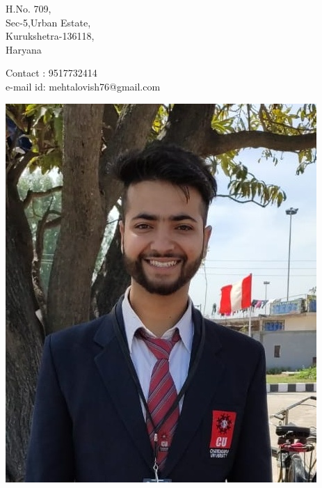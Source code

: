\documentclass[11pt]{article}
\begin{document}
\noindent\begin{minipage}{0.5\textwidth}      
\begin{flushleft}
H.No. 709, \\                                      %
Sec-5,Urban Estate,\\
Kurukshetra-136118,\\
Haryana
\end{flushleft}
\end{minipage}
\noindent\begin{minipage}{0.5\textwidth}
\begin{flushright}                                 %
     Contact  : 9517732414\\
e-mail id: mehtalovish76@gmail.com\\
\end{flushright}
\end{minipage}

\begin{flushright}
\includegraphics[scale=0.18]{profile.jpeg}      %
\end{flushright}
\end{document}
